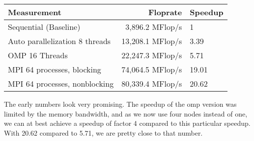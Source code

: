 \begin{center}

  \begin{tabular} {|l|r|l|}
    \hline
    Measurement & Floprate & Speedup \\ \hline
    Sequential (Baseline) & 3,896.2 MFlop/s & 1 \\ \hline
    Auto parallelization 8 threads & 13,208.1 MFlop/s & 3.39 \\ \hline
    OMP 16 Threads  & 22,247.3 MFlop/s & 5.71\\ \hline
    MPI 64 processes, blocking  & 74,064.5 MFlop/s & 19.01\\ \hline
    MPI 64 processes, nonblocking  & 80,339.4 MFlop/s & 20.62\\ \hline
    

    

    
  \end{tabular}

\end{center}
 The early numbers look very promising. The speedup of the omp version was limited by the memory bandwidth, and as we now use four nodes instead of one, we can at best achieve a speedup of factor 4 compared to this particular speedup. With 20.62 compared to 5.71, we are pretty close to that number.

